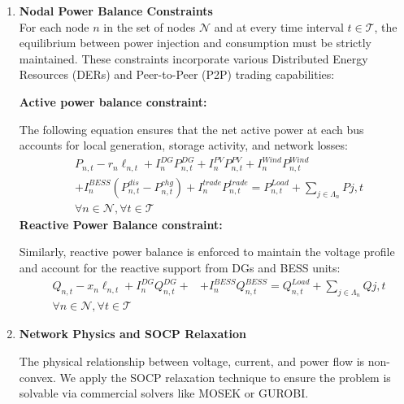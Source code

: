 \documentclass[preprint,12pt]{elsarticle}
\begin{document}
\begin{enumerate}
    \item  \textbf{Nodal Power Balance Constraints} \\ 
    For each node $n$ in the set of nodes $\mathcal{N}$ and at every time interval $t \in \mathcal{T}$, the equilibrium between power injection and consumption must be strictly maintained. These constraints incorporate various Distributed Energy Resources (DERs) and Peer-to-Peer (P2P) trading capabilities:
    
    \textbf{Active power balance constraint: }
    
    The following equation ensures that the net active power at each bus accounts for local generation, storage activity, and network losses:
        \begin{equation}
            \begin{aligned}
            & P_{n,t} - r_n \ell_{n,t} + I_n^{DG} P_{n,t}^{DG} + I_n^{PV} P_{n,t}^{PV} + I_n^{Wind} P_{n,t}^{Wind} \\
            & + I_n^{BESS} \left( P_{n,t}^{dis} - P_{n,t}^{chg} \right) + I_n^{trade} P_{n,t}^{trade} = P_{n,t}^{Load} + \sum_{j \in \Lambda_n} P{j,t} \\
            & \forall n \in \mathcal{N}, \forall t \in \mathcal{T}
            \end{aligned}
            \label{eq:active_balance}
        \end{equation}
    \textbf{Reactive Power Balance constraint:}
    
    Similarly, reactive power balance is enforced to maintain the voltage profile and account for the reactive support from DGs and BESS units:
        \begin{equation}
            \begin{aligned}
            & Q_{n,t} - x_n \ell_{n,t} + I_n^{DG} Q_{n,t}^{DG} +
            & + I_n^{BESS} Q_{n,t}^{BESS} = Q_{n,t}^{Load} + \sum_{j \in \Lambda_n} Q{j,t} \\
            & \forall n \in \mathcal{N}, \forall t \in \mathcal{T}
            \end{aligned}
            \label{eq:reactive_balance}
        \end{equation}
    \item \textbf{Network Physics and SOCP Relaxation}
    
    The physical relationship between voltage, current, and power flow is non-convex. We apply the SOCP relaxation technique to ensure the problem is solvable via commercial solvers like MOSEK or GUROBI.
    

\end{enumerate}
\end{document}
